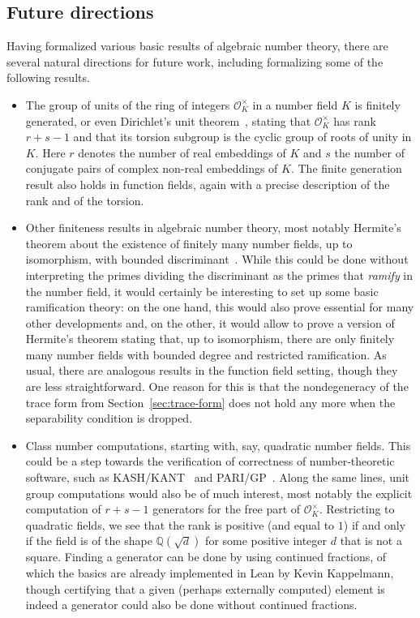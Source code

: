 \documentclass[sn-mathphys]{sn-jnl}%
\newcommand*{\OK}[1][K]{\mathcal{O}_{#1}}
\newcommand{\QQ}{\mathbb{Q}}
\begin{document}
\subsection{Future directions}\label{sec:future_directions}

Having formalized various basic results of algebraic number theory, there are several natural directions for future work, including formalizing some of the following results.
\begin{itemize}

\item The group of units of the ring of integers $\OK^{\times}$ in a number field $K$ is finitely generated, or even Dirichlet's unit theorem~\cite[Theorem 7.4]{Neukirch}, stating that $\OK^{\times}$ has rank $r+s-1$ and that its torsion subgroup is the cyclic group of roots of unity in $K$. Here $r$ denotes the number of real embeddings of $K$ and $s$ the number of conjugate pairs of complex non-real embeddings of $K$. The finite generation result also holds in function fields, again with a precise description of the rank and of the torsion.

\item Other finiteness results in algebraic number theory, most notably Hermite's theorem about the existence of finitely many number fields, up to isomorphism,
with bounded discriminant~\cite[Theorem 2.16]{Neukirch}. While this could be done without interpreting the primes dividing the discriminant as the primes that \emph{ramify} in the number field, it would certainly be interesting to set up some basic ramification theory: on the one hand, this would also prove essential for many other developments and, on the other, it would allow to prove a version of Hermite's theorem stating that, up to isomorphism, there are only finitely many number fields with bounded degree and restricted ramification.
As usual, there are analogous results in the function field setting, though they are less straightforward. One reason for this is that the nondegeneracy of the trace form from Section~\ref{sec:trace-form} does not hold any more when the separability condition is dropped.

\item Class number computations, starting with, say, quadratic number fields.
This could be a step towards the verification of correctness of number-theoretic software, such as KASH/KANT~\cite{kash} and PARI/GP~\cite{PARI2}.
Along the same lines, unit group computations would also be of much interest, most notably the explicit computation of $r+s-1$ generators for the free part of $\OK^{\times}$. %
Restricting to quadratic fields, we see that the rank is positive (and equal to $1$) if and only if the field is of the shape $\QQ(\sqrt{d})$ for some positive integer $d$ that is not a square.
Finding a generator can %
be done by using continued fractions, of which the basics are already implemented in Lean by Kevin Kappelmann, though certifying that a given (perhaps externally computed) element is indeed a generator could also be done without continued fractions.


\end{itemize}
\end{document}
